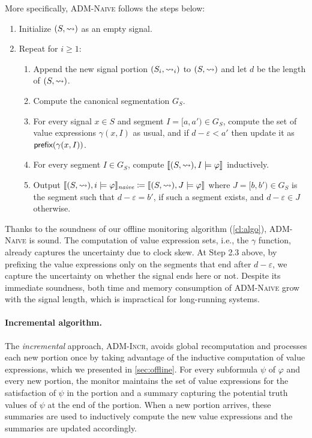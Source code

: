More specifically, \textsc{ADM-Naive} follows the steps below:
\begin{enumerate}[label*=\arabic*.]
	\item Initialize $(S,{\rightsquigarrow})$ as an empty signal.
	\item Repeat for $i \geq 1$:
	\begin{enumerate}[leftmargin=5pt,label*=\arabic*]
		\item Append the new signal portion $(S_i,{\rightsquigarrow}_i)$ to $(S,{\rightsquigarrow})$ and let $d$ be the length of $(S,{\rightsquigarrow})$.
		\item Compute the canonical segmentation $G_S$.
		\item For every signal $x \in S$ and segment $I = [a, a') \in G_S$, compute the set of value expressions $\gamma(x,I)$ as usual, and if $d-\varepsilon < a'$ then update it as $\textsf{prefix}(\gamma(x,I))$.
		\item For every segment $I \in G_S$, compute $\llbracket (S, {\rightsquigarrow}), I \models \varphi \rrbracket$ inductively.
		\item Output $\llbracket (S, {\rightsquigarrow}), i \models \varphi \rrbracket_{\textit{naive}} \coloneqq \llbracket (S, {\rightsquigarrow}), J \models \varphi \rrbracket$ where $J = [b,b') \in G_S$ is the segment such that $d - \varepsilon = b'$, if such a segment exists, and $d - \varepsilon \in J$ otherwise.
	\end{enumerate}
\end{enumerate}
Thanks to the soundness of our offline monitoring algorithm (\cref{cl:algo}), \textsc{ADM-Naive} is sound.
The computation of value expression sets, i.e., the $\gamma$ function, already captures the uncertainty due to clock skew.
At Step 2.3 above, by prefixing the value expressions only on the segments that end after $d-\varepsilon$, we capture the uncertainty on whether the signal ends here or not.
Despite its immediate soundness, both time and memory consumption of \textsc{ADM-Naive} grow with the signal length, which is impractical for long-running systems.

\paragraph*{Incremental algorithm.}
The \emph{incremental} approach, \textsc{ADM-Incr}, avoids global recomputation and processes each new portion once by taking advantage of the inductive computation of value expressions, which we presented in \cref{sec:offline}.
For every subformula $\psi$ of $\varphi$ and every new portion, the monitor maintains the set of value expressions for the satisfaction of $\psi$ in the portion and a summary capturing the potential truth values of $\psi$ at the end of the portion.
When a new portion arrives, these summaries are used to inductively compute the new value expressions and the summaries are updated accordingly.


